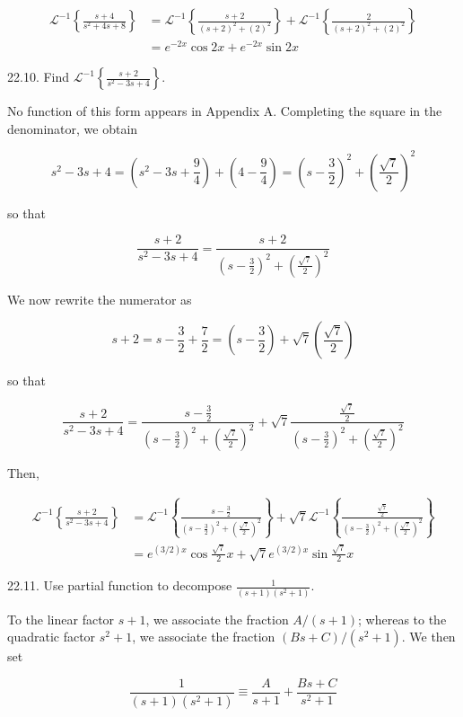 \documentclass[10pt]{article}
\begin{document}
$$
\begin{aligned}
\mathscr{L}^{-1}\left\{\frac{s+4}{s^{2}+4 s+8}\right\} & =\mathscr{L}^{-1}\left\{\frac{s+2}{(s+2)^{2}+(2)^{2}}\right\}+\mathscr{L}^{-1}\left\{\frac{2}{(s+2)^{2}+(2)^{2}}\right\} \\
& =e^{-2 x} \cos 2 x+e^{-2 x} \sin 2 x
\end{aligned}
$$

22.10. Find $\mathscr{L}^{-1}\left\{\frac{s+2}{s^{2}-3 s+4}\right\}$.

No function of this form appears in Appendix A. Completing the square in the denominator, we obtain

$$
s^{2}-3 s+4=\left(s^{2}-3 s+\frac{9}{4}\right)+\left(4-\frac{9}{4}\right)=\left(s-\frac{3}{2}\right)^{2}+\left(\frac{\sqrt{7}}{2}\right)^{2}
$$

so that

$$
\frac{s+2}{s^{2}-3 s+4}=\frac{s+2}{\left(s-\frac{3}{2}\right)^{2}+\left(\frac{\sqrt{7}}{2}\right)^{2}}
$$

We now rewrite the numerator as

$$
s+2=s-\frac{3}{2}+\frac{7}{2}=\left(s-\frac{3}{2}\right)+\sqrt{7}\left(\frac{\sqrt{7}}{2}\right)
$$

so that

$$
\frac{s+2}{s^{2}-3 s+4}=\frac{s-\frac{3}{2}}{\left(s-\frac{3}{2}\right)^{2}+\left(\frac{\sqrt{7}}{2}\right)^{2}}+\sqrt{7} \frac{\frac{\sqrt{7}}{2}}{\left(s-\frac{3}{2}\right)^{2}+\left(\frac{\sqrt{7}}{2}\right)^{2}}
$$

Then,

$$
\begin{aligned}
\mathscr{L}^{-1}\left\{\frac{s+2}{s^{2}-3 s+4}\right\} & =\mathscr{L}^{-1}\left\{\frac{s-\frac{3}{2}}{\left(s-\frac{3}{2}\right)^{2}+\left(\frac{\sqrt{7}}{2}\right)^{2}}\right\}+\sqrt{7} \mathscr{L}^{-1}\left\{\frac{\frac{\sqrt{7}}{2}}{\left(s-\frac{3}{2}\right)^{2}+\left(\frac{\sqrt{7}}{2}\right)^{2}}\right\} \\
& =e^{(3 / 2) x} \cos \frac{\sqrt{7}}{2} x+\sqrt{7} e^{(3 / 2) x} \sin \frac{\sqrt{7}}{2} x
\end{aligned}
$$

22.11. Use partial function to decompose $\frac{1}{(s+1)\left(s^{2}+1\right)}$.

To the linear factor $s+1$, we associate the fraction $A /(s+1)$; whereas to the quadratic factor $s^{2}+1$, we associate the fraction $(B s+C) /\left(s^{2}+1\right)$. We then set


\begin{equation*}
\frac{1}{(s+1)\left(s^{2}+1\right)} \equiv \frac{A}{s+1}+\frac{B s+C}{s^{2}+1} \tag{1}
\end{equation*}
\end{document}
